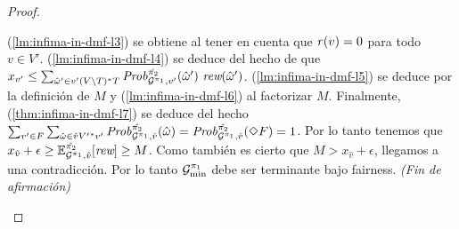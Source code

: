 \begin{proof}
\begin{proofofclaim}
    (\ref{lm:infima-in-dmf-l3}) se obtiene al tener en cuenta que $\mathit{r}(v) = 0$ para todo $v \in V'$.
    (\ref{lm:infima-in-dmf-l4}) se deduce del hecho de que 
    $x_{v'} \leq \sum_{\hat{\omega}' \in v' (V \setminus T)^*T}  \MDPProb{\hat{\strat{2}}}_{\StochG^{\strat{1}},v'}(\hat{\omega}')\ \Rewards(\hat{\omega}')$.
    (\ref{lm:infima-in-dmf-l5}) se deduce por la definición de $M$ y
    (\ref{lm:infima-in-dmf-l6}) al factorizar $M$.
    Finalmente, (\ref{thm:infima-in-dmf-l7}) se deduce del hecho 
    $\sum_{v' \in F} \sum_{\hat{\omega} \in \hat{v}{V'}^*v'} \mathit{Prob}^{\hat{\pi_{2}}}_{\mathcal{G}^{\pi_{1}},\hat{v}}(\hat{\omega}) =
    \mathit{Prob}^{\hat{\pi_{2}}}_{\mathcal{G}^{\pi_{1}},\hat{v}} (\Diamond F) = 1$.
    Por lo tanto tenemos que
    $x_{\hat{v}} + \epsilon \geq \mathbb{E}^{\hat{\pi_{2}}}_{\mathcal{G}^{\pi_{1}},\hat{v}}[\textit{rew}] \geq M$.
    Como también es cierto que $M >  x_{\hat{v}} + \epsilon$, llegamos a una contradicción.
    Por lo tanto $\mathcal{G}^{\pi_{1}}_{\min}$ debe ser terminante bajo fairness.
    \hfill\emph{(Fin de afirmación)}\qedhere
  \end{proofofclaim}



\end{proof}
